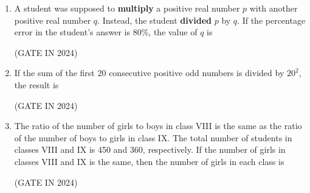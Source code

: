 \documentclass[journal,12pt,onecolumn]{IEEEtran}
\theoremstyle{remark}
\begin{document}
\begin{enumerate}
    \item A student was supposed to \textbf{multiply} a positive real number $p$ with another positive
    real number $q$. Instead, the student \textbf{divided} $p$ by $q$. If the percentage error in the
    student's answer is 80\%, the value of $q$ is
    
    \hfill{(GATE IN 2024)}
    \begin{enumerate}
    \end{enumerate}

    \item If the sum of the first 20 consecutive positive odd numbers is divided by $20^2$, the
    result is
    
    \hfill{(GATE IN 2024)}
    \begin{enumerate}
    \end{enumerate}

    \item The ratio of the number of girls to boys in class VIII is the same as the ratio of the
    number of boys to girls in class IX. The total number of students  in
    classes VIII and IX is 450 and 360, respectively. If the number of girls in classes
    VIII and IX is the same, then the number of girls in each class is
    
    \hfill{(GATE IN 2024)}
    \begin{enumerate}
    \end{enumerate}


\end{enumerate}
\end{document}
